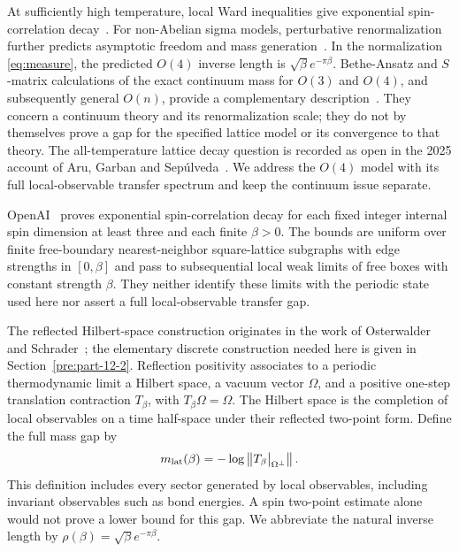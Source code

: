 At sufficiently high temperature, local Ward inequalities give exponential
spin-correlation decay~\cite[Theorem~3.2]{AizenmanSimonWard}.
For non-Abelian sigma models, perturbative renormalization further
predicts asymptotic freedom and mass generation~\cite{Polyakov,BrezinZinnJustin,BrezinZinnJustinLeGuillou}.
In the normalization \eqref{eq:measure}, the predicted $O(4)$ inverse
length is $\sqrt\beta e^{-\pi\beta}$. Bethe-Ansatz and $S$-matrix
calculations of the exact continuum mass for $O(3)$ and $O(4)$, and
subsequently general $O(n)$, provide a
complementary description~\cite{HasenfratzMaggioreNiedermayer,HasenfratzNiedermayer}.
They concern a continuum theory and its renormalization scale; they do
not by themselves prove a gap for the specified lattice model or its
convergence to that theory. The all-temperature lattice decay question
is recorded as open in the 2025 account of Aru, Garban and
Sep\'ulveda~\cite[Section~1]{AGS}. We address the $O(4)$ model with its full
local-observable transfer spectrum and keep the continuum issue separate.

OpenAI~\cite[Theorem~1.1 and Corollary~1.2]{OpenAIClassicalONDecay}
proves exponential spin-correlation decay for each fixed integer internal
spin dimension at least three and each finite $\beta>0$. The bounds are
uniform over finite free-boundary nearest-neighbor square-lattice subgraphs
with edge strengths in $[0,\beta]$ and pass to subsequential local weak
limits of free boxes with constant strength $\beta$. They neither identify
these limits with the periodic state used here nor assert a full
local-observable transfer gap.

The reflected Hilbert-space construction originates in the work of
Osterwalder and Schrader~\cite{OS73,OS75}; the elementary discrete
construction needed here is given in Section~\ref{pre:part-12-2}.
Reflection positivity associates to a periodic thermodynamic limit a
Hilbert space, a vacuum vector $\Omega$, and a positive one-step
translation contraction $T_\beta$, with $T_\beta\Omega=\Omega$.
The Hilbert space is the completion of local observables on a time
half-space under their reflected two-point form. Define the full mass
gap by
\begin{equation}
\label{eq:mass-definition}
 m_{\mathrm{lat}}(\beta)=-\log\left\lVert T_\beta\big|_{\Omega^\perp}\right\rVert.
\end{equation}
This definition includes every sector generated by local observables,
including invariant observables such as bond energies. A spin
two-point estimate alone would not prove a lower bound for this gap.
We abbreviate the natural inverse length by
$\rho(\beta)=\sqrt\beta e^{-\pi\beta}$.

